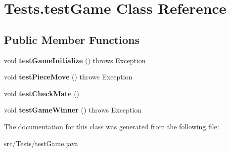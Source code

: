 \hypertarget{class_tests_1_1test_game}{}\section{Tests.\+test\+Game Class Reference}
\label{class_tests_1_1test_game}
\subsection*{Public Member Functions}
\begin{DoxyCompactItemize}
\item 
\mbox{\label{class_tests_1_1test_game_ac2ea48c2e0a3c2da0c50340add120907}} 
void {\bfseries test\+Game\+Initialize} ()  throws Exception
\item 
\mbox{\label{class_tests_1_1test_game_ad254bc120efed7ce38f702fc6123bbb8}} 
void {\bfseries test\+Piece\+Move} ()  throws Exception
\item 
\mbox{\label{class_tests_1_1test_game_af31c7fa0777baeb91b7a13a8ed8949eb}} 
void {\bfseries test\+Check\+Mate} ()
\item 
\mbox{\label{class_tests_1_1test_game_a3faa83edd4ec3e4ba1f4d9d26434827f}} 
void {\bfseries test\+Game\+Winner} ()  throws Exception
\end{DoxyCompactItemize}


The documentation for this class was generated from the following file\+:\begin{DoxyCompactItemize}
\item 
src/\+Tests/test\+Game.\+java\end{DoxyCompactItemize}
